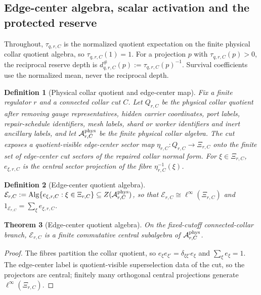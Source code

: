 \documentclass[11pt]{article}
\newtheorem{theorem}{Theorem}[section]
\newtheorem{definition}[theorem]{Definition}
\theoremstyle{remark}
\theoremstyle{plain}
\begin{document}
\subsection{Edge-center algebra, scalar activation and the protected reserve}
\label{sec:quotient-edge-scalar-z6}

Throughout, \(\tau_{q,r,C}\) is the normalized quotient expectation on the
finite physical collar quotient algebra, so \(\tau_{q,r,C}(1)=1\). For a
projection \(p\) with \(\tau_{q,r,C}(p)>0\), the reciprocal reserve depth is
\(d^{\#}_{q,r,C}(p):=\tau_{q,r,C}(p)^{-1}\). Survival coefficients use the
normalized mean, never the reciprocal depth.

\begin{definition}[Physical collar quotient and edge-center map]
\label{def:physical-collar-edge-center-map}
Fix a finite regulator \(r\) and a connected collar cut \(C\). Let \(Q_{r,C}\)
be the physical collar quotient after removing gauge representatives, hidden
carrier coordinates, port labels, repair-schedule identifiers, mesh labels,
shard or worker identifiers and inert ancillary labels, and let
\(\mathcal A^{\rm phys}_{r,C}\) be the finite physical collar algebra. The cut
exposes a quotient-visible edge-center sector map
\(\eta_{r,C}:Q_{r,C}\to\Xi_{r,C}\) onto the finite set of edge-center cut
sectors of the repaired collar normal form. For \(\xi\in\Xi_{r,C}\),
\(e_{\xi,r,C}\) is the central sector projection of the fibre
\(\eta_{r,C}^{-1}(\xi)\).
\end{definition}

\begin{definition}[Edge-center quotient algebra]
\label{def:edge-center-quotient-algebra}
\(\mathcal E_{r,C}:=\operatorname{Alg}\{e_{\xi,r,C}:\xi\in\Xi_{r,C}\}
\subseteq Z(\mathcal A^{\rm phys}_{r,C})\), so that
\(\mathcal E_{r,C}\cong\ell^\infty(\Xi_{r,C})\) and
\(1_{\mathcal E_{r,C}}=\sum_\xi e_{\xi,r,C}\).
\end{definition}

\begin{theorem}[Edge-center quotient algebra]
\label{thm:edge-center-quotient-algebra}
On the fixed-cutoff connected-collar branch, \(\mathcal E_{r,C}\) is a finite
commutative central subalgebra of \(\mathcal A^{\rm phys}_{r,C}\).
\end{theorem}

\begin{proof}
The fibres partition the collar quotient, so
\(e_{\xi}e_{\xi'}=\delta_{\xi\xi'}e_\xi\) and \(\sum_\xi e_\xi=1\). The
edge-center label is quotient-visible superselection data of the cut, so the
projectors are central; finitely many orthogonal central projections
generate \(\ell^\infty(\Xi_{r,C})\).
\end{proof}
\end{document}
